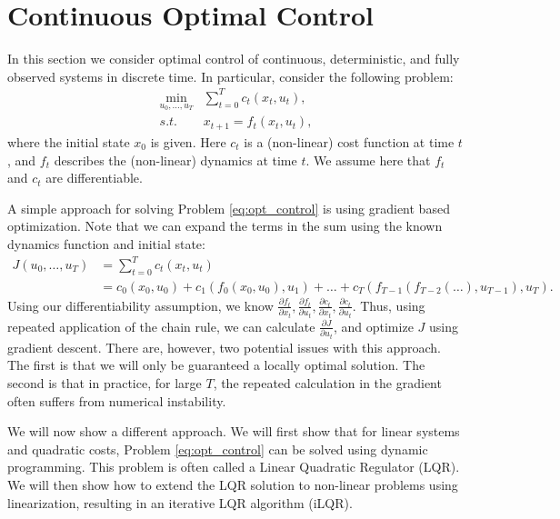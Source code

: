 \section{Continuous Optimal Control}
In this section we consider optimal control of continuous, deterministic, and fully observed systems in discrete time. 
In particular, consider the following problem:
\begin{equation}\label{eq:opt_control}
    \begin{split}
        \min_{u_0,\dots,u_{T}} & \sum_{t=0}^T c_t(x_t, u_t), \\
        s.t. \quad & {x_{t + 1}} = {f_t}({x_t},{u_t}), 
    \end{split}
\end{equation}
where the initial state $x_0$ is given. Here $c_t$ is a (non-linear) cost function at time $t$, and $f_t$ describes the (non-linear) dynamics  at time $t$. We assume here that $f_t$ and $c_t$ are differentiable.

A simple approach for solving Problem \ref{eq:opt_control} is using gradient based optimization. Note that we can expand the terms in the sum using the known dynamics function and initial state:
\begin{equation*}
\begin{split}
        J(u_0,\dots,u_T) &= \sum_{t=0}^T c_t(x_t, u_t) \\
        & = c_0(x_0, u_0) + c_1(f_0(x_0,u_0), u_1) + \dots + c_T(f_{T-1}(f_{T-2}(\dots ),u_{T-1}), u_T).
\end{split}
\end{equation*}
Using our differentiability assumption, we know $\frac{\partial f_t}{\partial x_t}, \frac{\partial f_t}{\partial u_t}, \frac{\partial c_t}{\partial x_t}, \frac{\partial c_t}{\partial u_t}$. Thus, using repeated application of the chain rule, we can calculate $\frac{\partial J}{\partial u_t}$, and optimize $J$ using gradient descent. There are, however, two potential issues with this approach. The first is that we will only be guaranteed a locally optimal solution. The second is that in practice, for large $T$, the repeated calculation in the gradient often suffers from numerical instability.

We will now show a different approach. We will first show that for linear systems and quadratic costs, Problem \ref{eq:opt_control} can be solved using dynamic programming. This problem is often called a Linear Quadratic Regulator (LQR). We will then show how to extend the LQR solution to non-linear problems using linearization, resulting in an iterative LQR algorithm (iLQR).

